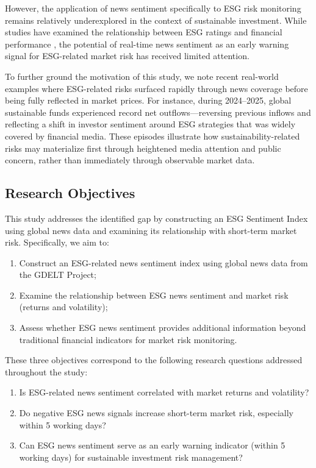 \documentclass[12pt,a4paper]{article}
\begin{document}
However, the application of news sentiment specifically to ESG risk monitoring remains relatively underexplored in the context of sustainable investment. While studies have examined the relationship between ESG ratings and financial performance \citep{amel2018esg}, the potential of real-time news sentiment as an early warning signal for ESG-related market risk has received limited attention.

To further ground the motivation of this study, we note recent real-world examples where ESG-related risks surfaced rapidly through news coverage before being fully reflected in market prices. For instance, during 2024–2025, global sustainable funds experienced record net outflows—reversing previous inflows and reflecting a shift in investor sentiment around ESG strategies that was widely covered by financial media. These episodes illustrate how sustainability-related risks may materialize first through heightened media attention and public concern, rather than immediately through observable market data.

\subsection{Research Objectives}
\label{subsec:objectives}

This study addresses the identified gap by constructing an ESG Sentiment Index using global news data and examining its relationship with short-term market risk. Specifically, we aim to:

\begin{enumerate}[itemsep=0.5em]
    \item Construct an ESG-related news sentiment index using global news data from the GDELT Project;
    \item Examine the relationship between ESG news sentiment and market risk (returns and volatility);
    \item Assess whether ESG news sentiment provides additional information beyond traditional financial indicators for market risk monitoring.
\end{enumerate}

These three objectives correspond to the following research questions addressed throughout the study:
\begin{enumerate}[itemsep=0.3em, label=\textbf{RQ\arabic*.}]
    \item Is ESG-related news sentiment correlated with market returns and volatility?
    \item Do negative ESG news signals increase short-term market risk, especially within 5 working days?
    \item Can ESG news sentiment serve as an early warning indicator (within 5 working days) for sustainable investment risk management?
\end{enumerate}
\end{document}
